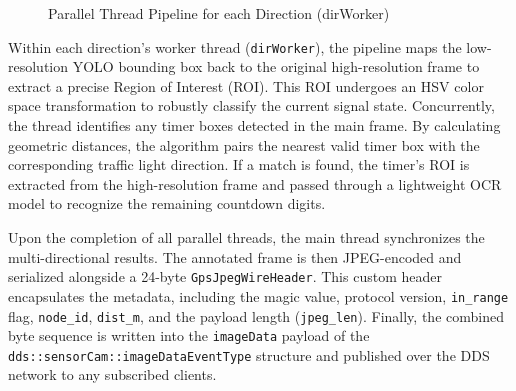 \begin{figure}[H]
\vspace{0.5cm}
\caption{Parallel Thread Pipeline for each Direction (dirWorker)}
\label{fig:thread_flow}
\end{figure}

Within each direction's worker thread (\texttt{dirWorker}), the pipeline maps the low-resolution YOLO bounding box back to the original high-resolution frame to extract a precise Region of Interest (ROI). This ROI undergoes an HSV color space transformation to robustly classify the current signal state. Concurrently, the thread identifies any timer boxes detected in the main frame. By calculating geometric distances, the algorithm pairs the nearest valid timer box with the corresponding traffic light direction. If a match is found, the timer's ROI is extracted from the high-resolution frame and passed through a lightweight OCR model to recognize the remaining countdown digits.

Upon the completion of all parallel threads, the main thread synchronizes the multi-directional results. The annotated frame is then JPEG-encoded and serialized alongside a 24-byte \texttt{GpsJpegWireHeader}. This custom header encapsulates the metadata, including the magic value, protocol version, \texttt{in\_range} flag, \texttt{node\_id}, \texttt{dist\_m}, and the payload length (\texttt{jpeg\_len}). Finally, the combined byte sequence is written into the \texttt{imageData} payload of the \texttt{dds::sensorCam::imageDataEventType} structure and published over the DDS network to any subscribed clients.